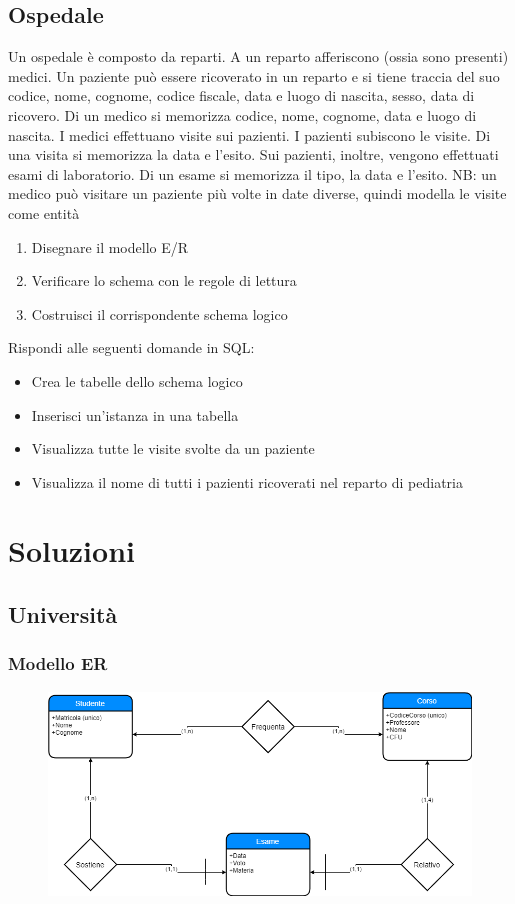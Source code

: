 \documentclass{article}
\begin{document}
	\subsection{Ospedale}
	Un ospedale è composto da reparti. A un reparto afferiscono (ossia sono presenti) medici. Un paziente può essere ricoverato in un reparto e si tiene traccia del suo codice, nome, cognome, codice fiscale, data e luogo di nascita, sesso, data di ricovero. Di un medico si memorizza codice, nome, cognome, data e luogo di nascita. I medici effettuano visite sui pazienti. I pazienti subiscono le visite. Di una visita si memorizza la data e l’esito. Sui pazienti, inoltre, vengono effettuati esami di laboratorio. Di un esame si memorizza il tipo, la data e l’esito. NB: un medico può visitare un paziente più volte in date diverse, quindi modella le visite come entità
	\begin{enumerate}
		\item Disegnare il modello E/R
		\item Verificare lo schema con le regole di lettura
		\item Costruisci il corrispondente schema logico
	\end{enumerate}
	Rispondi alle seguenti domande in SQL:
	\begin{itemize}
		\item Crea le tabelle dello schema logico
		\item Inserisci un'istanza in una tabella
		\item Visualizza tutte le visite svolte da un paziente
		\item Visualizza il nome di tutti i pazienti ricoverati nel reparto di pediatria
	\end{itemize}
	\pagebreak
	
	\section{Soluzioni}
	\subsection{Università}
	\subsubsection{Modello ER}
	\begin{figure}[h!]
		\centering
		\includegraphics[scale=0.5]{images/Universita.png}
	\end{figure}
\end{document}
